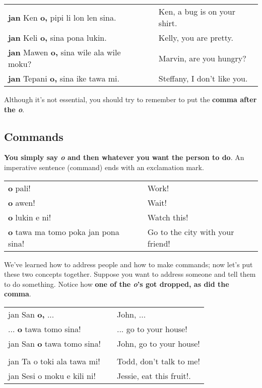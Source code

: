 \begin{supertabular}{p{5,5cm}|ll}
\textbf{jan} Ken \textbf{o,} pipi li lon len sina. && Ken, a bug is on your shirt. \\
\textbf{jan} Keli \textbf{o,} sina pona lukin. && Kelly, you are pretty. \\
\textbf{jan} Mawen \textbf{o,} sina wile ala wile moku? && Marvin, are you hungry? \\
\textbf{jan} Tepani \textbf{o,} sina ike tawa mi. && Steffany, I don't like you. \\
\end{supertabular} 

Although it's not essential, you should try to remember to put the \textbf{comma after the \textit{o}}. 

%
\subsection*{Commands}
%
\textbf{You simply say \textit{o} and then whatever you want the person to do}. 
An imperative sentence (command) ends with an exclamation mark.

\begin{supertabular}{p{5,5cm}|ll}
\textbf{o} pali! && Work! \\
\textbf{o} awen! && Wait! \\
\textbf{o} lukin e ni! && Watch this! \\
\textbf{o} tawa ma tomo poka jan pona sina! && Go to the city with your friend! \\
\end{supertabular} 

We've learned how to address people and how to make commands; now let's put these two concepts together. 
Suppose you want to address someone and tell them to do something. 
Notice how \textbf{one of the \textit{o}'s got dropped, as did the comma}. 

\begin{supertabular}{p{5,5cm}|ll}
jan San \textbf{o,} ...  && John, ... \\
 ... \textbf{o} tawa tomo sina! && ... go to your house! \\
jan San \textbf{o} tawa tomo sina!  && John, go to your house! \\
 && \\ %
jan Ta o toki ala tawa mi! && Todd, don't talk to me! \\
jan Sesi o moku e kili ni! && Jessie, eat this fruit!. \\
\end{supertabular} 

